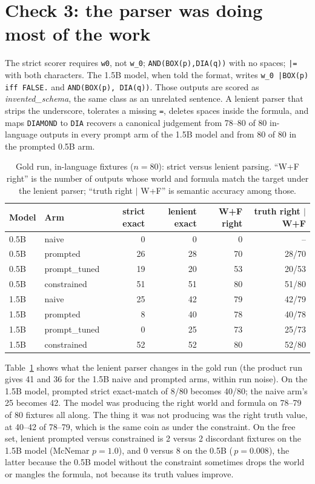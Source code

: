 \documentclass[11pt]{article}
\begin{document}
\section{Check 3: the parser was doing most of the work}
\label{sec:lenient}

The strict scorer requires \texttt{w0}, not \texttt{w\_0}; \texttt{AND(BOX(p),DIA(q))} with no spaces; \texttt{|=} with both characters. The 1.5B model, when told the format, writes \texttt{w\_0 |BOX(p) iff FALSE.} and \texttt{AND(BOX(p), DIA(q))}. Those outputs are scored as \emph{invented\_schema}, the same class as an unrelated sentence. A lenient parser that strips the underscore, tolerates a missing \texttt{=}, deletes spaces inside the formula, and maps \texttt{DIAMOND} to \texttt{DIA} recovers a canonical judgement from 78--80 of 80 in-language outputs in every prompt arm of the 1.5B model and from 80 of 80 in the prompted 0.5B arm.

\begin{table}[t]
\centering
\caption{Gold run, in-language fixtures ($n{=}80$): strict versus lenient parsing. ``W+F right'' is the number of outputs whose world and formula match the target under the lenient parser; ``truth right $\mid$ W+F'' is semantic accuracy among those.}
\label{tab:lenient}
\small
\begin{tabular}{llrrrr}
\toprule
Model & Arm & strict exact & lenient exact & W+F right & truth right $\mid$ W+F \\
\midrule
0.5B & naive & 0 & 0 & 0 & -- \\
0.5B & prompted & 26 & 28 & 70 & 28/70 \\
0.5B & prompt\_tuned & 19 & 20 & 53 & 20/53 \\
0.5B & constrained & 51 & 51 & 80 & 51/80 \\
\midrule
1.5B & naive & 25 & 42 & 79 & 42/79 \\
1.5B & prompted & 8 & 40 & 78 & 40/78 \\
1.5B & prompt\_tuned & 0 & 25 & 73 & 25/73 \\
1.5B & constrained & 52 & 52 & 80 & 52/80 \\
\bottomrule
\end{tabular}
\end{table}

Table~\ref{tab:lenient} shows what the lenient parser changes in the gold run (the product run gives 41 and 36 for the 1.5B naive and prompted arms, within run noise). On the 1.5B model, prompted strict exact-match of 8/80 becomes 40/80; the naive arm's 25 becomes 42. The model was producing the right world and formula on 78--79 of 80 fixtures all along. The thing it was not producing was the right truth value, at 40--42 of 78--79, which is the same coin as under the constraint. On the free set, lenient prompted versus constrained is 2 versus 2 discordant fixtures on the 1.5B model (McNemar $p=1.0$), and 0 versus 8 on the 0.5B (\,$p=0.008$), the latter because the 0.5B model without the constraint sometimes drops the world or mangles the formula, not because its truth values improve.
\end{document}
